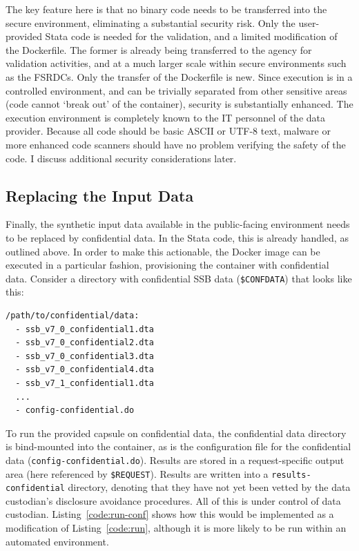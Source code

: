 \documentclass[inline]{hdsr}
\begin{document}
The key feature here is that no binary code needs to be transferred into the secure environment, eliminating a substantial security risk. Only the user-provided Stata code is needed for the validation, and a limited modification of the Dockerfile. The former is already being transferred to the agency for validation activities, and at a much larger scale within secure environments such as the \acp{FSRDC}. Only the transfer of the Dockerfile is new. Since execution is in a controlled environment, and can be trivially separated from other sensitive areas (code cannot `break out' of the container), security is substantially enhanced. The execution environment is completely known to the IT personnel of the data provider. Because all code should be basic ASCII or UTF-8 text, malware or more enhanced code scanners should have no problem verifying the safety of the code. I discuss additional security considerations later.

\subsection{Replacing the Input Data}

Finally, the synthetic input data available in the public-facing environment needs to be replaced by confidential data. In the Stata code, this is already handled, as outlined above. In order to make this actionable, the Docker image can be executed in a particular fashion, provisioning the container with confidential data. Consider a directory with confidential SSB data (\texttt{\$CONFDATA}) that looks like this:

\begin{lstlisting}[language=bash]
/path/to/confidential/data:
  - ssb_v7_0_confidential1.dta
  - ssb_v7_0_confidential2.dta
  - ssb_v7_0_confidential3.dta
  - ssb_v7_0_confidential4.dta
  - ssb_v7_1_confidential1.dta
  ...
  - config-confidential.do   
\end{lstlisting}

To run the provided capsule on confidential data, the confidential data directory is  bind-mounted into the container, as is the configuration file for the confidential data (\texttt{config-confidential.do}). Results are stored in a request-specific output area (here referenced by \texttt{\$REQUEST}). Results are written into a \texttt{results-confidential} directory, denoting that they have not yet been vetted by the data custodian's disclosure avoidance procedures. All of this is under control of data custodian. Listing~\ref{code:run-conf} shows how this would be implemented as a  modification of Listing~\ref{code:run}, although it is more likely to be run within an automated environment. 
\end{document}
